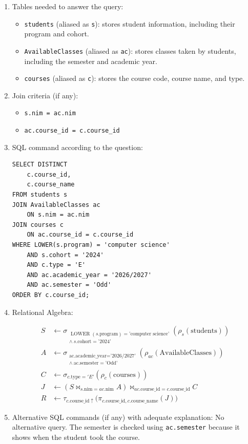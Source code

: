 \begin{enumerate}
    \itemsep0em
    \item Tables needed to answer the query:
    \begin{itemize}
        \item \texttt{students} (aliased as \texttt{s}): stores student information, including their program and cohort.
        \item \texttt{AvailableClasses} (aliased as \texttt{ac}): stores classes taken by students, including the semester and academic year.
        \item \texttt{courses} (aliased as \texttt{c}): stores the course code, course name, and type.
    \end{itemize}

    \item Join criteria (if any):
    \begin{itemize}
        \item \texttt{s.nim = ac.nim}
        \item \texttt{ac.course\_id = c.course\_id}
    \end{itemize}

    \item SQL command according to the question:
    \begin{lstlisting}
SELECT DISTINCT
    c.course_id,
    c.course_name
FROM students s
JOIN AvailableClasses ac
    ON s.nim = ac.nim
JOIN courses c
    ON ac.course_id = c.course_id
WHERE LOWER(s.program) = 'computer science'
    AND s.cohort = '2024'
    AND c.type = 'E'
    AND ac.academic_year = '2026/2027'
    AND ac.semester = 'Odd'
ORDER BY c.course_id;
    \end{lstlisting}

    \item Relational Algebra:

    \begin{align*}
    S &\leftarrow
    \sigma_{\substack{
        \operatorname{LOWER}(s.\text{program})
        =\text{'computer science'}\\
        \land\ s.\text{cohort}=\text{'2024'}
    }}(\rho_s(\text{students})) \\[4pt]
    A &\leftarrow
    \sigma_{\substack{
        \text{ac.academic\_year}=\text{'2026/2027'}\\
        \land\ \text{ac.semester}=\text{'Odd'}
    }}(\rho_{ac}(\text{AvailableClasses})) \\[4pt]
    C &\leftarrow
    \sigma_{c.\text{type}='E'}
    (\rho_c(\text{courses})) \\[4pt]
    J &\leftarrow
    (S \bowtie_{s.\text{nim}=ac.\text{nim}} A)
    \bowtie_{ac.\text{course\_id}=c.\text{course\_id}} C
    \\[4pt]
    R &\leftarrow
    \tau_{c.\text{course\_id}\uparrow}
    \Big(
    \pi_{c.\text{course\_id},c.\text{course\_name}}(J)
    \Big)
    \end{align*}

    \item Alternative SQL commands (if any) with adequate explanation: No alternative query. The semester is checked using \texttt{ac.semester} because it shows when the student took the course.
\end{enumerate}

